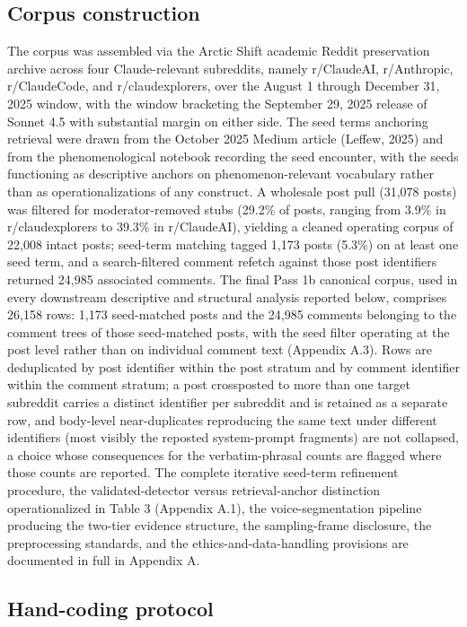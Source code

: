 \documentclass[11pt]{article}
\begin{document}
\subsection{Corpus construction}

The corpus was assembled via the Arctic Shift academic Reddit preservation archive across four Claude-relevant subreddits, namely r/ClaudeAI, r/Anthropic, r/ClaudeCode, and r/claudexplorers, over the August 1 through December 31, 2025 window, with the window bracketing the September 29, 2025 release of Sonnet 4.5 with substantial margin on either side. The seed terms anchoring retrieval were drawn from the October 2025 Medium article (Leffew, 2025) and from the phenomenological notebook recording the seed encounter, with the seeds functioning as descriptive anchors on phenomenon-relevant vocabulary rather than as operationalizations of any construct. A wholesale post pull (31,078 posts) was filtered for moderator-removed stubs (29.2\% of posts, ranging from 3.9\% in r/claudexplorers to 39.3\% in r/ClaudeAI), yielding a cleaned operating corpus of 22,008 intact posts; seed-term matching tagged 1,173 posts (5.3\%) on at least one seed term, and a search-filtered comment refetch against those post identifiers returned 24,985 associated comments. The final Pass 1b canonical corpus, used in every downstream descriptive and structural analysis reported below, comprises 26,158 rows: 1,173 seed-matched posts and the 24,985 comments belonging to the comment trees of those seed-matched posts, with the seed filter operating at the post level rather than on individual comment text (Appendix A.3). Rows are deduplicated by post identifier within the post stratum and by comment identifier within the comment stratum; a post crossposted to more than one target subreddit carries a distinct identifier per subreddit and is retained as a separate row, and body-level near-duplicates reproducing the same text under different identifiers (most visibly the reposted system-prompt fragments) are not collapsed, a choice whose consequences for the verbatim-phrasal counts are flagged where those counts are reported. The complete iterative seed-term refinement procedure, the validated-detector versus retrieval-anchor distinction operationalized in Table 3 (Appendix A.1), the voice-segmentation pipeline producing the two-tier evidence structure, the sampling-frame disclosure, the preprocessing standards, and the ethics-and-data-handling provisions are documented in full in Appendix A.

\subsection{Hand-coding protocol}
\end{document}
